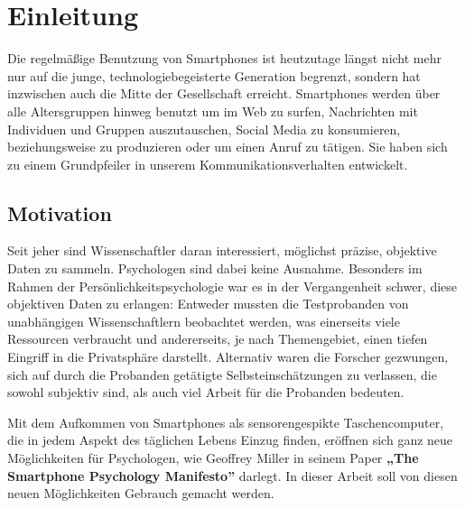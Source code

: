 
\chapter{Einleitung}
\label{ch:Einleitung}

Die regelmäßige Benutzung von Smartphones ist heutzutage längst nicht mehr nur auf die junge, technologiebegeisterte Generation begrenzt,
sondern hat inzwischen auch die Mitte der Gesellschaft erreicht\cite{smartphonealter}.
Smartphones werden über alle Altersgruppen hinweg benutzt um im Web zu surfen, Nachrichten mit Individuen und Gruppen auszutauschen, Social Media zu konsumieren, beziehungsweise zu produzieren oder um einen Anruf zu tätigen.
Sie haben sich zu einem Grundpfeiler in unserem Kommunikationsverhalten entwickelt.

\par



\section{Motivation}

Seit jeher sind Wissenschaftler daran interessiert, möglichst präzise, objektive Daten zu sammeln.
Psychologen sind dabei keine Ausnahme.
Besonders im Rahmen der Persönlichkeitspsychologie war es in der Vergangenheit schwer, diese objektiven Daten zu erlangen:
Entweder mussten die Testprobanden von unabhängigen Wissenschaftlern beobachtet werden,
was einerseits viele Ressourcen verbraucht und andererseits, je nach Themengebiet,
einen tiefen Eingriff in die Privatsphäre darstellt. Alternativ waren die Forscher gezwungen,
sich auf durch die Probanden getätigte Selbsteinschätzungen zu verlassen,
die sowohl subjektiv sind, als auch viel Arbeit für die Probanden bedeuten. %
\par
Mit dem Aufkommen von Smartphones als sensorengespikte Taschencomputer, die in jedem Aspekt des täglichen Lebens Einzug finden,
eröffnen sich ganz neue Möglichkeiten für Psychologen, wie Geoffrey Miller in seinem Paper \textbf{„The Smartphone Psychology Manifesto”} \cite{miller2012smartphone}
darlegt. In dieser Arbeit soll von diesen neuen Möglichkeiten Gebrauch gemacht werden.\par




